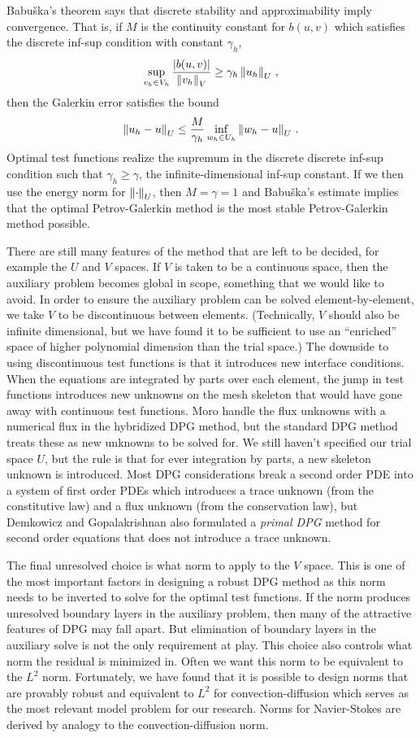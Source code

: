 \documentclass[Proposal.tex]{subfiles}
\begin{document}
Babu\v{s}ka's theorem\cite{Babuska70} says that discrete stability and approximability imply convergence.
That is, if $M$ is the continuity constant for $b(u,v)$ which satisfies the discrete inf-sup condition with constant $\gamma_h$,
\[
\sup_{v_h\in V_h}\frac{|b(u,v)|}{\left\| v_h \right\|_V}\geq\gamma_h\left\| u_h \right\|_U\,,
\]
then the Galerkin error satisfies the bound
\[
\left\| u_h-u \right\|_U\leq\frac{M}{\gamma_h}\inf_{w_h\in U_h}\left\| w_h-u \right\|_U\,.
\]
Optimal test functions realize the supremum in the discrete discrete inf-sup condition such that $\gamma_h\geq\gamma$, 
the infinite-dimensional inf-sup constant.
If we then use the energy norm for $\left\| \cdot \right\|_U$, then $M=\gamma=1$ and Babu\v{s}ka's estimate implies that
the optimal Petrov-Galerkin method is the most stable Petrov-Galerkin method possible.

There are still many features of the method that are left to be decided, for example the $U$ and $V$ spaces.
If $V$ is taken to be a continuous space, then the auxiliary problem becomes global in scope, something that we would like to avoid.
In order to ensure the auxiliary problem can be solved element-by-element, we take $V$ to be discontinuous between elements.
(Technically, $V$ should also be infinite dimensional, but we have found it to be sufficient to use an ``enriched'' space of higher
polynomial dimension than the trial space.)
The downside to using discontinuous test functions is that it introduces new interface conditions.
When the equations are integrated by parts over each element, the jump in test functions introduces new unknowns on the mesh skeleton
that would have gone away with continuous test functions.
Moro \etal\cite{MoroNguyenPeraire11} handle the flux unknowns with a numerical flux in the hybridized DPG method, but the standard DPG method treats
these as new unknowns to be solved for.
We still haven't specified our trial space $U$, but the rule is that for ever integration by parts, a new skeleton unknown is introduced.
Most DPG considerations break a second order PDE into a system of first order PDEs which introduces a trace unknown (from the constitutive law) 
and a flux unknown (from the conservation law), but Demkowicz and Gopalakrishnan also formulated a \emph{primal DPG} method for second order equations
that does not introduce a trace unknown.

The final unresolved choice is what norm to apply to the $V$ space.
This is one of the most important factors in designing a robust DPG method as this norm needs to be inverted to solve for the optimal test functions.
If the norm produces unresolved boundary layers in the auxiliary problem, then many of the attractive features of DPG may fall apart.
But elimination of boundary layers in the auxiliary solve is not the only requirement at play. 
This choice also controls what norm the residual is minimized in. 
Often we want this norm to be equivalent to the $L^2$ norm.
Fortunately, we have found that it is possible to design norms that are provably robust and equivalent to $L^2$ for convection-diffusion which
serves as the most relevant model problem for our research.
Norms for Navier-Stokes are derived by analogy to the convection-diffusion norm.
\end{document}
